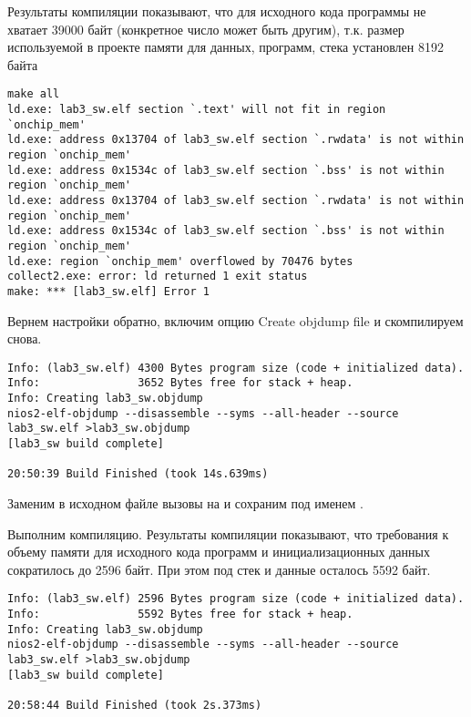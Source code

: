 Результаты компиляции показывают, что для исходного кода программы не хватает 39000 байт (конкретное число может быть другим), т.к. размер используемой в проекте памяти для данных, программ, стека установлен 8192 байта

\begin{lstlisting}[caption=Ошибка при компиляции, style=console]
make all 
ld.exe: lab3_sw.elf section `.text' will not fit in region `onchip_mem'
ld.exe: address 0x13704 of lab3_sw.elf section `.rwdata' is not within region `onchip_mem'
ld.exe: address 0x1534c of lab3_sw.elf section `.bss' is not within region `onchip_mem'
ld.exe: address 0x13704 of lab3_sw.elf section `.rwdata' is not within region `onchip_mem'
ld.exe: address 0x1534c of lab3_sw.elf section `.bss' is not within region `onchip_mem'
ld.exe: region `onchip_mem' overflowed by 70476 bytes
collect2.exe: error: ld returned 1 exit status
make: *** [lab3_sw.elf] Error 1
\end{lstlisting}

Вернем настройки обратно, включим опцию Create objdump file и скомпилируем снова. 
\begin{lstlisting}[caption=Результаты компиляции, style=console]
Info: (lab3_sw.elf) 4300 Bytes program size (code + initialized data).
Info:               3652 Bytes free for stack + heap.
Info: Creating lab3_sw.objdump
nios2-elf-objdump --disassemble --syms --all-header --source lab3_sw.elf >lab3_sw.objdump
[lab3_sw build complete]

20:50:39 Build Finished (took 14s.639ms)
\end{lstlisting}

Заменим в исходном файле вызовы  на  и сохраним под именем .


Выполним компиляцию. Результаты компиляции показывают, что требования к объему памяти для исходного кода программ и инициализационных данных сократилось до 2596 байт. При этом под стек и данные осталось 5592 байт.
\begin{lstlisting}[caption=Результаты компиляции, style=console]
Info: (lab3_sw.elf) 2596 Bytes program size (code + initialized data).
Info:               5592 Bytes free for stack + heap.
Info: Creating lab3_sw.objdump
nios2-elf-objdump --disassemble --syms --all-header --source lab3_sw.elf >lab3_sw.objdump
[lab3_sw build complete]

20:58:44 Build Finished (took 2s.373ms)
\end{lstlisting}

